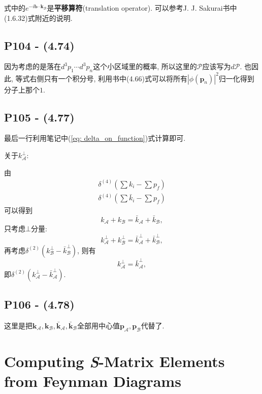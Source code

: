 \documentclass[10pt,b5paper,openany]{book}
\begin{document}
式中的$e^{-i\mathbf{b}\cdot\mathbf{k_{\mathcal{B}}}}$是\textbf{平移算符}(translation operator). 可以参考J. J. Sakurai书中(1.6.32)式附近的说明. 

\subsection{P104 - (4.74)}

因为考虑的是落在$d^3p_1\cdots d^3p_n$这个小区域里的概率, 所以这里的$\mathcal{P}$应该写为$d\mathcal{P}$. 也因此, 等式右侧只有一个积分号, 利用书中(4.66)式可以将所有$|\phi(\mathbf{p}_n)|^2$归一化得到分子上那个$1$. 

\subsection{P105 - (4.77)}

最后一行利用笔记中(\ref{eq: delta_on_function})式计算即可. 

关于$k_{\mathcal{A}}^{\bot}$: 

由
\begin{gather}
  \delta^{(4)}(\sum k_i - \sum p_f) \\
  \delta^{(4)}(\sum \bar{k}_i - \sum p_f)
\end{gather}
可以得到
\begin{equation}
  k_\mathcal{A} + k_\mathcal{B} = \bar{k}_\mathcal{A} + \bar{k}_\mathcal{B}, 
\end{equation}
只考虑$\bot$分量: 
\begin{equation}
  k_{\mathcal{A}}^{\bot} + k_{\mathcal{B}}^{\bot} = \bar{k}_{\mathcal{A}}^{\bot} + \bar{k}_{\mathcal{B}}^{\bot}, 
\end{equation}
再考虑$\delta^{(2)}(k_{\mathcal{B}}^{\bot} - \bar{k}_{\mathcal{B}}^{\bot})$, 则有
\begin{equation}
  k_{\mathcal{A}}^{\bot} = \bar{k}_{\mathcal{A}}^{\bot}, 
\end{equation}
即$\delta^{(2)}(k_{\mathcal{A}}^{\bot} - \bar{k}_{\mathcal{A}}^{\bot})$.

\subsection{P106 - (4.78)}

这里是把$\mathbf{k}_{\mathcal{A}}, \mathbf{k}_{\mathcal{B}}, \bar{\mathbf{k}}_{\mathcal{A}}, \bar{\mathbf{k}}_{\mathcal{B}}$全部用中心值$\mathbf{p}_{\mathcal{A}}, \mathbf{p}_{\mathcal{B}}$代替了. 

\section{Computing \textit{S}-Matrix Elements from Feynman Diagrams}
\end{document}
